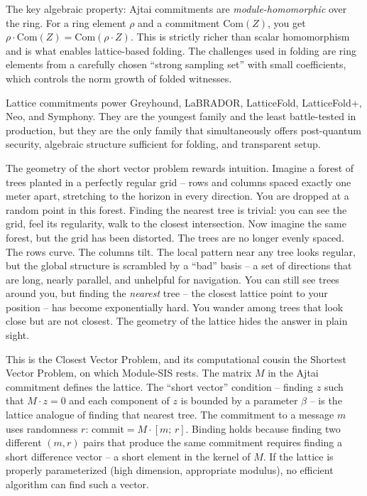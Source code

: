 \documentclass[
  11pt,
  openany]{report}
\begin{document}
The key algebraic property: Ajtai commitments are \emph{module-homomorphic} over
the ring. For a ring element \(\rho\) and a commitment \(\text{Com}(Z)\), you
get \(\rho \cdot \text{Com}(Z) = \text{Com}(\rho \cdot Z)\). This is strictly
richer than scalar homomorphism and is what enables lattice-based folding. The
challenges used in folding are ring elements from a carefully chosen ``strong
sampling set'' with small coefficients, which controls the norm growth of folded
witnesses.

Lattice commitments power Greyhound, LaBRADOR, LatticeFold, LatticeFold+, Neo,
and Symphony. They are the youngest family and the least battle-tested in
production, but they are the only family that simultaneously offers post-quantum
security, algebraic structure sufficient for folding, and transparent setup.

The geometry of the short vector problem rewards intuition. Imagine a forest of
trees planted in a perfectly regular grid -- rows and columns spaced exactly one
meter apart, stretching to the horizon in every direction. You are dropped at a
random point in this forest. Finding the nearest tree is trivial: you can see
the grid, feel its regularity, walk to the closest intersection. Now imagine the
same forest, but the grid has been distorted. The trees are no longer evenly
spaced. The rows curve. The columns tilt. The local pattern near any tree looks
regular, but the global structure is scrambled by a ``bad'' basis -- a set of
directions that are long, nearly parallel, and unhelpful for navigation. You can
still see trees around you, but finding the \emph{nearest} tree -- the closest
lattice point to your position -- has become exponentially hard. You wander
among trees that look close but are not closest. The geometry of the lattice
hides the answer in plain sight.

This is the Closest Vector Problem, and its computational cousin the Shortest
Vector Problem, on which Module-SIS rests. The matrix \(M\) in the Ajtai
commitment defines the lattice. The ``short vector'' condition -- finding \(z\)
such that \(M \cdot z = 0\) and each component of \(z\) is bounded by a
parameter \(\beta\) -- is the lattice analogue of finding that nearest tree. The
commitment to a message \(m\) uses randomness \(r\):
\(\text{commit} = M \cdot [m;\, r]\). Binding holds because finding two
different \((m, r)\) pairs that produce the same commitment requires finding a
short difference vector -- a short element in the kernel of \(M\). If the
lattice is properly parameterized (high dimension, appropriate modulus), no
efficient algorithm can find such a vector.
\end{document}
